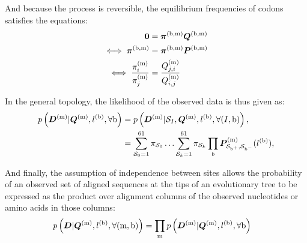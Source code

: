 And because the process is reversible, the equilibrium frequencies of \glspl{codon} satisfies the equations:
\begin{align}
    \bm{0} & = \bm{\pi}^{(\text{b}, \text{m})} \bm{Q}^{(\text{b}, \text{m})} \\
    \iff \bm{\pi}^{(\text{b}, \text{m})} & = \bm{\pi}^{(\text{b}, \text{m})} \bm{P}^{(\text{b}, \text{m})} \\
    \iff \dfrac{\pi_{{i}}^{(\text{m})}}{\pi_{{j}}^{(\text{m})}} & = \dfrac{Q_{{j}, {i}}^{(\text{m})}}{Q_{{i}, {j}}^{(\text{m})}}
\end{align}

In the general topology, the \gls{likelihood} of the observed data is thus given as:
\begin{align}
    p\left(\bm{D}^{(\text{m})}| \bm{Q}^{(\text{m})}, l^{(\text{b})}, \forall \text{b} \right) & = p\left(\bm{D}^{(\text{m})}| \mathcal{S}_{I}, \bm{Q}^{(\text{m})}, l^{(\text{b})}, \forall (I, \text{b}) \right), \\
    & = \sum\limits_{\mathcal{S}_{0}=1}^{61} \pi_{\mathcal{S}_{0}} \hdots \sum\limits_{\mathcal{S}_{k}=1}^{61} \pi_{\mathcal{S}_{k}} \prod_{b} \bm{P}^{(\text{m})}_{\mathcal{S}_{\text{b}^{+}}, \mathcal{S}_{\text{b}^{-}}}(l^{(\text{b})}), \label{eq:likelihood-site}
\end{align}

And finally, the assumption of independence between sites allows the probability of an observed set of aligned sequences at the tips of an evolutionary tree to be expressed as the product over alignment columns of the observed nucleotides or amino acids in those columns:
\begin{align}
    p\left(\bm{D}| \bm{Q}^{(\text{m})}, l^{(\text{b})}, \forall (\text{m}, \text{b}) \right) & = \prod_{\text{m}} p\left(\bm{D}^{(\text{m})}| \bm{Q}^{(\text{m})}, l^{(\text{b})}, \forall \text{b} \right) \label{eq:likelihood}
\end{align}

